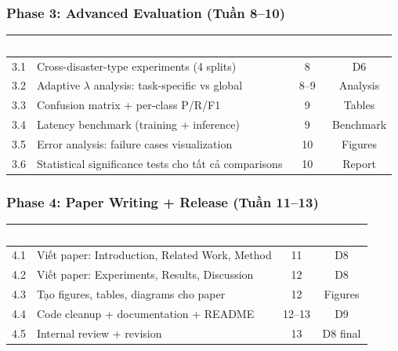 \documentclass[12pt,a4paper]{article}
\begin{document}
\subsubsection{Phase 3: Advanced Evaluation (Tuần 8--10)}

\begin{table}[H]
\centering
{}
\begin{tabularx}{\textwidth}{c X c c}
\toprule
\rowcolor{phase3!90}
\textcolor{white}{\textbf{\#}} & \textcolor{white}{\textbf{Task}} & \textcolor{white}{\textbf{Tuần}} & \textcolor{white}{\textbf{Output}} \\
\midrule
3.1 & Cross-disaster-type experiments (4 splits) & 8 & D6 \\
3.2 & Adaptive $\lambda$ analysis: task-specific vs global & 8--9 & Analysis \\
3.3 & Confusion matrix + per-class P/R/F1 & 9 & Tables \\
3.4 & Latency benchmark (training + inference) & 9 & Benchmark \\
3.5 & Error analysis: failure cases visualization & 10 & Figures \\
3.6 & Statistical significance tests cho tất cả comparisons & 10 & Report \\
\bottomrule
\end{tabularx}
\end{table}

\subsubsection{Phase 4: Paper Writing + Release (Tuần 11--13)}

\begin{table}[H]
\centering
{}
\begin{tabularx}{\textwidth}{c X c c}
\toprule
\rowcolor{phase4!90}
\textcolor{white}{\textbf{\#}} & \textcolor{white}{\textbf{Task}} & \textcolor{white}{\textbf{Tuần}} & \textcolor{white}{\textbf{Output}} \\
\midrule
4.1 & Viết paper: Introduction, Related Work, Method & 11 & D8 \\
4.2 & Viết paper: Experiments, Results, Discussion & 12 & D8 \\
4.3 & Tạo figures, tables, diagrams cho paper & 12 & Figures \\
4.4 & Code cleanup + documentation + README & 12--13 & D9 \\
4.5 & Internal review + revision & 13 & D8 final \\
\bottomrule
\end{tabularx}
\end{table}
\end{document}

